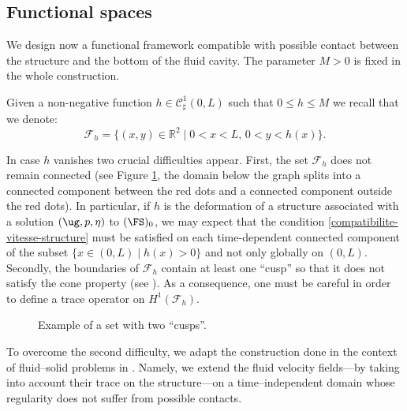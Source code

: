 \subsection{Functional spaces}
We design now a functional framework compatible with possible contact between the structure and the bottom of the fluid cavity. The param\-e\-ter $M > 0$ is fixed in the whole construction.

Given a non-negative function $h \in \mathcal{C}^{1}_{\sharp}(0,L)$ such that $0\leq h \leq M$ we recall that we denote:
\[
\mathcal{F}_{h}=\{(x,y)\in\mathbb{R}^{2}\mid 0<x<L,\,0<y<h(x)\}.
\]

In case $h$ vanishes two crucial difficulties appear.
First, the set $\mathcal{F}_{h}$ does not remain connected (see Figure \ref{fig_cusp}, the domain below the graph splits into a connected component between the red dots and a connected component outside the red dots). In particular, if $h$ is the deformation of a structure associated with a solution $(\ug,p,\eta)$ to
$(\FS)_0$, we may expect that the condition \eqref{compatibilite-vitesse-structure} must be satisfied on each time-dependent connected component of the subset $\{x \in (0, L)\mid h(x) >0\}$ and not only globally on $(0,L)$.
Secondly, the boundaries of $\mathcal{F}_{h}$ contain at least one ``cusp'' so that it does not satisfy the cone property (see \cite{Adams}). As a consequence, one must be careful in order to define a trace operator on $H^{1}(\mathcal F_h)$.

\begin{figure}[!ht]
\centering\smaller
{}
\vspace*{-\baselineskip}
\caption{Example of a set with two ``cusps''. \label{fig_cusp}}
\end{figure}

To overcome the second difficulty, we adapt the construction done in the context of fluid--solid problems in \cite{SanMartin-Starovoitov-Tucsnak}. Namely, we extend the fluid velocity fields---by taking into account their trace on the structure---on a time--independent domain whose regularity does not suffer from possible contacts.

